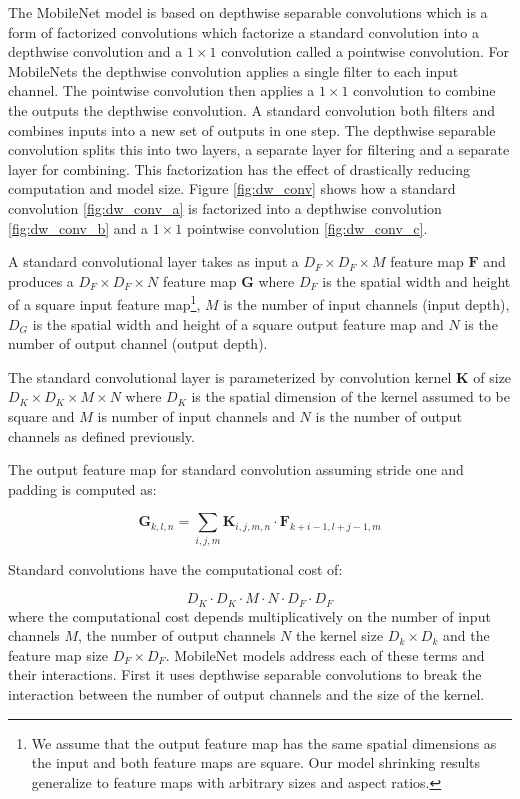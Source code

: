 \documentclass[10pt,twocolumn,letterpaper]{article}
\begin{document}
The MobileNet model is based on depthwise separable convolutions which is a form of factorized convolutions which factorize a standard convolution into a depthwise convolution and a $1 \times 1$ convolution called a pointwise convolution. For MobileNets the depthwise convolution applies a single filter to each input channel. The pointwise convolution then applies a $1 \times 1$ convolution to combine the outputs the depthwise convolution. A standard convolution both filters and combines inputs into a new set of outputs in one step. The depthwise separable convolution splits this into two layers, a separate layer for filtering and a separate layer for combining. This factorization has the effect of drastically reducing computation and model size. Figure \ref{fig:dw_conv} shows how a standard convolution \ref{fig:dw_conv_a} is factorized into a depthwise convolution \ref{fig:dw_conv_b} and a $1 \times 1$ pointwise convolution \ref{fig:dw_conv_c}.

A standard convolutional layer takes as input a $D_F \times D_F \times M$ feature map $\mathbf{F}$ and produces a $D_F \times D_F \times N$ feature map $\mathbf{G}$ where $D_F$ is the spatial width and height of a square input feature map\footnote{We assume that the output feature map has the same spatial dimensions as the input and both feature maps are square. Our model shrinking results generalize to feature maps with arbitrary sizes and aspect ratios.}, $M$ is the number of input channels (input depth), $D_G$ is the spatial width and height of a square output feature map and $N$ is the number of output channel (output depth).

The standard convolutional layer is parameterized by convolution kernel $\mathbf{K}$ of size $D_K \times D_K \times M \times N$ where $D_K$ is the spatial dimension of the kernel assumed to be square and $M$ is number of input channels and $N$ is the number of output channels as defined previously. 

The output feature map for standard convolution assuming stride one and padding is computed as:

\begin{equation}
\mathbf{G}_{k,l,n} = \sum_{i,j,m} \mathbf{K}_{i,j,m,n} \cdot \mathbf{F}_{k+i-1,l+j-1,m}
\end{equation}

Standard convolutions have the computational cost of:

\begin{equation}
D_K \cdot D_K \cdot M \cdot N \cdot D_F \cdot D_F
\end{equation}
where the computational cost depends multiplicatively on the number of input channels $M$, the number of output channels $N$ the kernel size $D_k \times D_k$ and the feature map size $D_F \times D_F$. MobileNet models address each of these terms and their interactions. First it uses depthwise separable convolutions to break the interaction between the number of output channels and the size of the kernel. 
\end{document}
